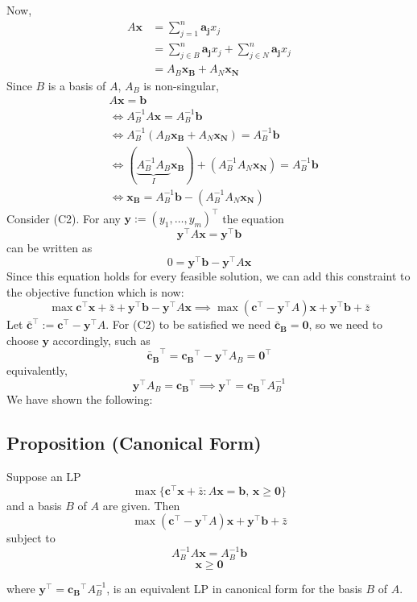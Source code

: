 Now,
\begin{align*}
    A\bm{x}
    &=\sum_{j = 1}^{n}\bm{a_j}x_j\\
    &=\sum_{j\in B}^{n}\bm{a_j}x_j+\sum_{j\in N}^{n}\bm{a_j}x_j\\
    &=A_B \bm{x_B}+A_N \bm{x_N}
\end{align*}
Since $B$ is a basis of $A$, $A_B$ is non-singular,
\begin{align*}
    &A\bm{x}=\bm{b}\\
    &\iff
    A_B^{-1}A\bm{x}=A_B^{-1}\bm{b}\\
    &\iff
    A_B^{-1}(A_B\bm{x_B}+A_N\bm{x_N})=A_B^{-1}\bm{b}\\
    &\iff
    (\underbrace{A_B^{-1} A_B}_{I}\bm{x_B})+
    (A_B^{-1} A_N\bm{x_N})=A_B^{-1}\bm{b}\\
    &\iff
    \bm{x_B}=A_B^{-1}\bm{b}-(A_B^{-1} A_N\bm{x_N})
\end{align*}
Consider (C2). For any $\bm{y}:=(y_1,\dots, y_m)^\top$
the equation
\[\bm{y}^\top A\bm{x}=\bm{y}^\top \bm{b}\]
can be written as
\[0=\bm{y}^\top \bm{b}-\bm{y}^\top A\bm{x}\]
Since  this  equation  holds  for  every  feasible  solution,  we  can  add  this 
constraint to the objective function which is now:
\[\max \bm{c}^\top  \bm{x}+\bar{z}+\bm{y}^\top \bm{b}-\bm{y}^\top A\bm{x}
\implies
\max (\bm{c}^\top -\bm{y}^\top A)\bm{x}+\bm{y}^\top \bm{b}+\bar{z}\]
Let $\bm{\bar{c}}^\top :=\bm{c}^\top -\bm{y}^\top A$. For (C2) to be satisfied we need
$\bm{\bar{c}_B}=\bm{0}$, so we need to choose $\bm{y}$ accordingly, such as
\[\bm{\bar{c}_B}^\top =\bm{c_B}^\top -\bm{y}^\top A_B=\bm{0}^\top \]
equivalently,
\[\bm{y}^\top A_B=\bm{c_B}^\top 
\implies
\bm{y}^\top =\bm{c_B}^\top A_B^{-1}\]
We have shown the following:


\begin{thmbox}
    \subsection{Proposition (Canonical Form)}
    Suppose an LP
    \[ \max \{\bm{c}^\top \bm{x}+\bar{z}:A \bm{x}=\bm{b},\, \bm{x}\ge \bm{0}\} \]
    and a basis $ B $ of $ A $ are given. Then
    \[\max (\bm{c}^\top -\bm{y}^\top A)\bm{x}+\bm{y}^\top \bm{b}+\bar{z}\]
    subject to
    \[ A_B^{-1}A\bm{x}=A_B^{-1}\bm{b} \]
    \[ \bm{x}\ge \bm{0} \]
    
    where $\bm{y}^\top =\bm{c_B}^\top A_B^{-1}$, is an equivalent LP in canonical form for the 
    basis $B$ of $A$.
\end{thmbox}

